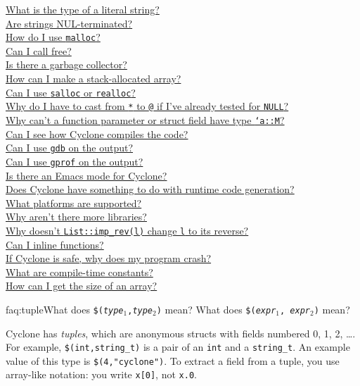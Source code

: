 \begin{small}
\hyperlink{faq:litstring}{What is the type of a literal string?}\\
\hyperlink{faq:nullterminate}{Are strings NUL-terminated?}\\
\hyperlink{faq:malloc}{How do I use \texttt{malloc}?}\\
\hyperlink{faq:free}{Can I call free?}\\
\hyperlink{faq:gc}{Is there a garbage collector?}\\
\hyperlink{faq:stackalloc}{How can I make a stack-allocated array?}\\
\hyperlink{faq:realloc}{Can I use \texttt{salloc} or \texttt{realloc}?}\\
\hyperlink{faq:nullcast}{Why do I have to cast from \texttt{*} to \texttt{@} if I've already tested for \texttt{NULL}?}\\
\hyperlink{faq:memkind}{Why can't a function parameter or struct field have type \texttt{`a::M}?}\\
\hyperlink{faq:compile}{Can I see how Cyclone compiles the code?}\\
\hyperlink{faq:gdb}{Can I use \texttt{gdb} on the output?}\\
\hyperlink{faq:gprof}{Can I use \texttt{gprof} on the output?}\\
\hyperlink{faq:emacs}{Is there an Emacs mode for Cyclone?}\\
\hyperlink{faq:rtcg}{Does Cyclone have something to do with runtime code generation?}\\
\hyperlink{faq:platforms}{What platforms are supported?}\\
\hyperlink{faq:libs}{Why aren't there more libraries?}\\
\hyperlink{faq:imprev}{Why doesn't \texttt{List::imp_rev(l)} change \texttt{l} to its reverse?}\\
\hyperlink{faq:inline}{Can I inline functions?}\\
\hyperlink{faq:crash}{If Cyclone is safe, why does my program crash?}\\
\hyperlink{faq:ctc}{What are compile-time constants?}\\
\hyperlink{faq:arraysize}{How can I get the size of an array?}
\end{small}
\fi

\begin{faqa}{faq:tuple}{What does \texttt{\$({\it type}$_1$,{\it type}$_2$)} mean?  What does \texttt{\$({\it expr}$_1$, {\it expr}$_2$)} mean?}

Cyclone has \emph{tuples}, which are anonymous structs with fields
numbered 0, 1, 2, \ldots.  For example, \texttt{\$(int,string_t)} is a
pair of an \texttt{int} and a \texttt{string_t}.  An example value of
this type is \texttt{\$(4,"cyclone")}.  To extract a field from a
tuple, you use array-like notation: you write \texttt{x[0]}, not
\texttt{x.0}.
\end{faqa}


